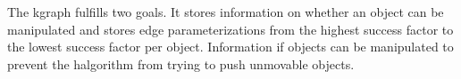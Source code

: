 


The \ac{kgraph} fulfills two goals. It stores information on whether an object can be manipulated and stores edge parameterizations from the highest success factor to the lowest success factor per object. Information if objects can be manipulated to prevent the \ac{halgorithm} from trying to push unmovable objects.\bs

